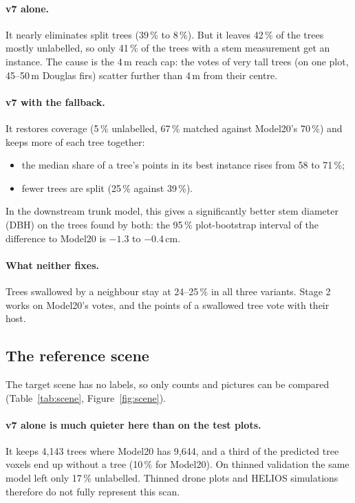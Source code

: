 \documentclass[11pt,a4paper]{article}
\begin{document}
\paragraph{v7 alone.} It nearly eliminates split trees (39\,\% to 8\,\%). But it leaves 42\,\% of the trees mostly unlabelled, so only 41\,\% of the trees with a stem measurement get an instance. The cause is the 4\,m reach cap: the votes of very tall trees (on one plot, 45--50\,m Douglas firs) scatter further than 4\,m from their centre.

\paragraph{v7 with the fallback.} It restores coverage (5\,\% unlabelled, 67\,\% matched against Model20's 70\,\%) and keeps more of each tree together:
\begin{itemize}
  \item the median share of a tree's points in its best instance rises from 58 to 71\,\%;
  \item fewer trees are split (25\,\% against 39\,\%).
\end{itemize}
In the downstream trunk model, this gives a significantly better stem diameter (DBH) on the trees found by both: the 95\,\% plot-bootstrap interval of the difference to Model20 is $-1.3$ to $-0.4$\,cm.

\paragraph{What neither fixes.} Trees swallowed by a neighbour stay at 24--25\,\% in all three variants. Stage 2 works on Model20's votes, and the points of a swallowed tree vote with their host.

\subsection{The reference scene}
\label{sec:scene}

The target scene has no labels, so only counts and pictures can be compared (Table~\ref{tab:scene}, Figure~\ref{fig:scene}).

\paragraph{v7 alone is much quieter here than on the test plots.} It keeps 4,143 trees where Model20 has 9,644, and a third of the predicted tree voxels end up without a tree (10\,\% for Model20). On thinned validation the same model left only 17\,\% unlabelled. Thinned drone plots and HELIOS simulations therefore do not fully represent this scan.
\end{document}
